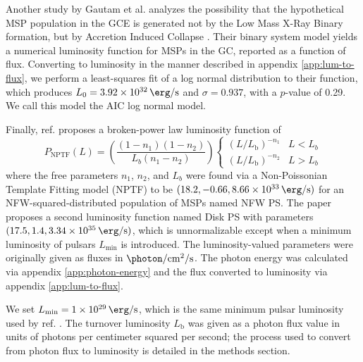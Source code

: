 \documentclass[a4paper,11pt]{article}
\newcommand{\parens}[1]{\left(#1\right)}
\newcommand{\fraci}[2]{#1 / #2}
\newcommand{\comment}[1]{\emph{\color{red}{#1}}}
\begin{document}
Another study by Gautam et al. analyzes the possibility that the hypothetical MSP population in the GCE is generated not by the Low Mass X-Ray Binary formation, but by Accretion Induced Collapse \cite{Gautam:2021wqn}. \comment{To distinguish between this, a definition of these two collapse methods, along with models other than an MSP model, should be put in the introduction. Mention the fact that the MSPs in the GCE would have to look different from that in the disk.} Their binary system model yields a numerical luminosity function for MSPs in the GC, reported as a function of flux. Converting to luminosity in the manner described in appendix \ref{app:lum-to-flux}, we perform a least-squares fit of a log normal distribution to their function, which produces $L_0 = \SI{3.92e+32}{\erg\per\second}$ and $\sigma = 0.937$, with a $p$-value of 0.29. We call this model the AIC log normal model.

Finally, ref. \cite{Lee:2015fea} proposes a broken-power law luminosity function of
\begin{equation}
    P_\text{NPTF}(L) = \parens{\frac{\parens{1-n_1}\parens{1-n_2}}{L_b \parens{n_1 - n_2}}}\begin{cases}
        \parens{\fraci{L}{L_\text{b}}}^{-n_{1}} & L < L_{b} \\
        \parens{\fraci{L}{L_\text{b}}}^{-n_{2}} & L > L_b
    \end{cases}
    \label{eqn:nptf}
\end{equation}
where the free parameters  $n_1$, $n_2$, and $L_b$ were found via a Non-Poissonian Template Fitting model (NPTF) to be $(18.2, -0.66, \SI{8.66e+33}{\erg\per\second})$ for an NFW-squared-distributed population of MSPs named NFW PS. The paper proposes a second luminosity function named Disk PS with parameters $(17.5, 1.4, \SI{3.34e+35}{\erg\per\second})$, which is unnormalizable except when a minimum luminosity of pulsars $L_\text{min}$ is introduced. \comment{I will want to remove the unnormalizable one. When should I do it?} The luminosity-valued parameters were originally given as fluxes in $\SI{}{\photon \per \centi\meter\squared \per \second}$. The photon energy was calculated via appendix \ref{app:photon-energy} and the flux converted to luminosity via appendix \ref{app:lum-to-flux}.

We set $L_\text{min}=\SI{1e29}{\erg\per\second}$, which is the same minimum pulsar luminosity used by ref. \cite{Zhong:2019ycb}. The turnover luminosity $L_\text{b}$ was given as a photon flux value in units of photons per centimeter squared per second; the process used to convert from photon flux to luminosity is detailed in the methods section.
\end{document}
